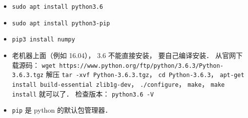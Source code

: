 

\begin{itemize}
\item \verb|sudo apt install python3.6|
\item \verb|sudo apt install python3-pip|
\item \verb|pip3 install numpy|
\item 老机器上面（例如 16.04）， 3.6 不能直接安装， 要自己编译安装． 从官网下载源码： \verb|wget https://www.python.org/ftp/python/3.6.3/Python-3.6.3.tgz| 解压 \verb|tar -xvf Python-3.6.3.tgz|， \verb|cd Python-3.6.3|， \verb|apt-get install build-essential zlib1g-dev|， \verb|./configure|， \verb|make|， \verb|make install| 就可以了． 检查版本： \verb|python3.6 -V|
\item \verb|pip| 是 python 的默认包管理器．
\end{itemize}
